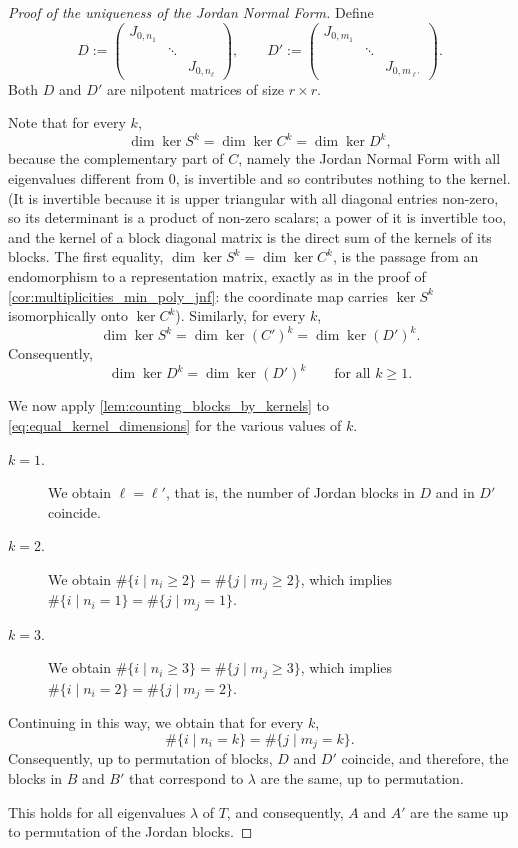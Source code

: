 \begin{proof}[Proof of the uniqueness of the Jordan Normal Form]
Define
\[
    D := \begin{pmatrix} J_{0,n_1} & & \\ & \ddots & \\ & & J_{0,n_\ell} \end{pmatrix}, \qquad D' := \begin{pmatrix} J_{0,m_1} & & \\ & \ddots & \\ & & J_{0,m_{\ell'}} \end{pmatrix}.
\]
Both $D$ and $D'$ are nilpotent matrices of size $r \times r$.

Note that for every $k$,
\[
    \dim \ker S^k = \dim \ker C^k = \dim \ker D^k,
\]
because the complementary part of $C$, namely the Jordan Normal Form with all eigenvalues different from $0$, is invertible and so contributes nothing to the kernel. (It is invertible because it is upper triangular with all diagonal entries non-zero, so its determinant is a product of non-zero scalars; a power of it is invertible too, and the kernel of a block diagonal matrix is the direct sum of the kernels of its blocks. The first equality, $\dim \ker S^k = \dim \ker C^k$, is the passage from an endomorphism to a representation matrix, exactly as in the proof of \cref{cor:multiplicities_min_poly_jnf}: the coordinate map carries $\ker S^k$ isomorphically onto $\ker C^k$). Similarly, for every $k$,
\[
    \dim \ker S^k = \dim \ker (C')^k = \dim \ker (D')^k.
\]
Consequently,
\begin{equation}
\label{eq:equal_kernel_dimensions}
    \dim \ker D^k = \dim \ker (D')^k \qquad \text{for all } k \ge 1.
\end{equation}

We now apply \cref{lem:counting_blocks_by_kernels} to \eqref{eq:equal_kernel_dimensions} for the various values of $k$.
\begin{description}
    \item[$k=1$.] We obtain $\ell = \ell'$, that is, the number of Jordan blocks in $D$ and in $D'$ coincide.
    \item[$k=2$.] We obtain $\#\{i \mid n_i \ge 2\} = \#\{j \mid m_j \ge 2\}$, which implies $\#\{i \mid n_i = 1\} = \#\{j \mid m_j = 1\}$.
    \item[$k=3$.] We obtain $\#\{i \mid n_i \ge 3\} = \#\{j \mid m_j \ge 3\}$, which implies $\#\{i \mid n_i = 2\} = \#\{j \mid m_j = 2\}$.
\end{description}
Continuing in this way, we obtain that for every $k$,
\[
    \#\{i \mid n_i = k\} = \#\{j \mid m_j = k\}.
\]
Consequently, up to permutation of blocks, $D$ and $D'$ coincide, and therefore, the blocks in $B$ and $B'$ that correspond to $\lambda$ are the same, up to permutation.

This holds for all eigenvalues $\lambda$ of $T$, and consequently, $A$ and $A'$ are the same up to permutation of the Jordan blocks.
\end{proof}

